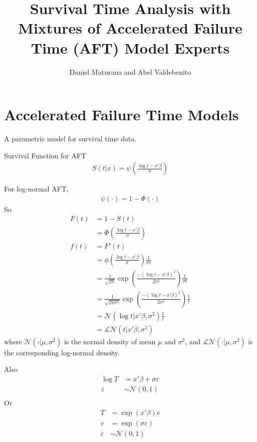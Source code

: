 \documentclass[11pt,letterpaper]{article}
\title{Survival Time Analysis with Mixtures of Accelerated Failure Time (AFT) Model Experts}
\author{Daniel Maturana and Abel Valdebenito}
\begin{document}
\maketitle

\section{Accelerated Failure Time Models}

A parametric model for survival time data.

Survival Function for AFT
\begin{align*}
    S(t|x) = \psi \left(  \frac{ \log t - x'\beta}{\sigma}\right)
\end{align*}

For log-normal AFT, 
\begin{align*}
    \psi(\cdot) = 1 - \Phi(\cdot)
\end{align*}
So
\begin{align*}
    F(t) &= 1 - S(t) \\
         &= \Phi\left( \frac{\log t - x'\beta}{\sigma} \right) \\
    f(t) &= F'(t) \\
         &= \phi\left( \frac{\log t - x'\beta}{\sigma} \right) \frac{1}{ \sigma t } \\
         &= \frac{1}{\sqrt{2 \pi}} \exp\left( \frac{ -(\log t - x'\beta)^2 }{ 2\sigma^2} \right) \frac{1}{\sigma t} \\
         &= \frac{1}{\sqrt{2 \pi \sigma^2}} \exp\left( \frac{ -(\log t - x'\beta)^2 }{ 2\sigma^2} \right) \frac{1}{t} \\
         &= \mathcal{N}( \log t | x'\beta, \sigma^2 ) \frac{1}{t} \\
         &= \mathcal{LN}( t | x'\beta, \sigma^2 )
\end{align*}
where $\mathcal{N}(\cdot|\mu, \sigma^2)$ is the normal density of mean $\mu$ and $\sigma^2$, and
$\mathcal{LN}(\cdot|\mu, \sigma^2)$ is the corresponding log-normal density.

Also 
\begin{align*}
    \log T  &= x'\beta + \sigma \varepsilon \\
    \varepsilon &\sim \mathcal{N}(0, 1) \\
\end{align*}
Or
\begin{align*}
     T  &= \exp(x'\beta) v \\
     v  &= \exp(\sigma \varepsilon) \\
     \varepsilon &\sim \mathcal{N}(0, 1) 
\end{align*}
\end{document}
